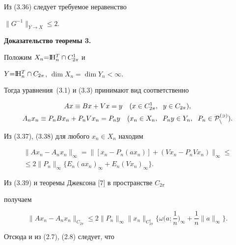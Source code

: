 Из (3.36) следует требуемое неравенство


$\|G^{-1}\|_{{Y\rightarrow X}} \leq 2$.


\medskip





{\bf Доказательство теоремы 3. }


Положим $X_n{=}\mathrm I \!\mathrm H_n^T\cap C_{2\pi}^1$ и


$Y{=}\mathrm I \!\mathrm H_n^T\cap C_{2\pi}$, $\dim X_n{=}\dim Y_n<\infty$.


Тогда уравнения~(3.1) и (3.3) принимают вид соответственно


\begin{gather}


Ax\equiv Bx+Vx=y\quad (x\in C_{2\pi}^1,\ \;y\in C_{2\pi}), \\


%


A_nx_n\equiv P_nBx_n+P_nVx_n=P_ny\quad (x_n\in X_n,\ \;P_ny\in Y_n,


\ \;P_n\in \rukopis{P}_n^{(3)}).


\end{gather}


Из (3.37), (3.38) для любого $x_n\in X_n$ находим


\begin{multline}


\|Ax_n-A_nx_n\|_{{\infty}} =\|[x_n-P_n(ax_n)]+(Vx_n-P_nVx_n)\|_{{\infty}}


\leq \\


%


\leq 2 \|P_n\|_{{\infty}}\{ E_n(ax_n)_{{\infty}} 


+ E_n(Vx_n)_{{\infty}}\}.


\end{multline}


Из (3.39) и теоремы Джексона [7] в пространстве $C_{2\pi}$


получаем


$$


\|Ax_n-A_nx_n\|_{{C_{2\pi}}}\leq 2 \|P_n\|_{\infty}


\|x_n\|_{{C_{2\pi}^1}}


\bigg\{ \omega\bigg(a;\frac{1}{n}\bigg)_\infty +


\frac{1}{n} \|a\|_{{\infty}} \bigg\} .


$$


Отсюда и из (2.7), (2.8) следует, что


